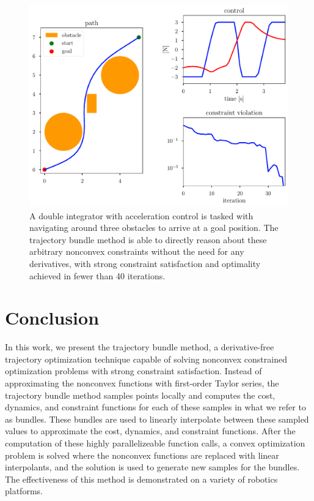 \begin{figure}
    \centering
    \includegraphics[width=0.9\linewidth]{bundles/examples/obstacle_fig.pdf}
    \caption{A double integrator with acceleration control is tasked with navigating around three obstacles to arrive at a goal position. The trajectory bundle method is able to directly reason about these arbitrary nonconvex constraints without the need for any derivatives, with strong constraint satisfaction and optimality achieved in fewer than 40 iterations.}
    \label{fig:btb:obstacle}
\end{figure}

\section{Conclusion}
In this work, we present the trajectory bundle method, a derivative-free trajectory optimization technique capable of solving nonconvex constrained optimization problems with strong constraint satisfaction. Instead of approximating the nonconvex functions with first-order Taylor series, the trajectory bundle method samples points locally and computes the cost, dynamics, and constraint functions for each of these samples in what we refer to as bundles. These bundles are used to linearly interpolate between these sampled values to approximate the cost, dynamics, and constraint functions. After the computation of these highly parallelizeable function calls, a convex optimization problem is solved where the nonconvex functions are replaced with linear interpolants, and the solution is used to generate new samples for the bundles.  The effectiveness of this method is demonstrated on a variety of robotics platforms.
